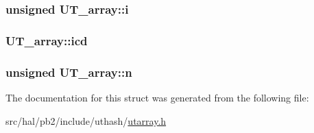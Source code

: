 \subsubsection[{\texorpdfstring{i}{i}}]{\setlength{\rightskip}{0pt plus 5cm}unsigned U\+T\+\_\+array\+::i}\hypertarget{struct_u_t__array_add4a738223f032481193cc5901cef56e}{}\label{struct_u_t__array_add4a738223f032481193cc5901cef56e}
\subsubsection[{\texorpdfstring{icd}{icd}}]{ U\+T\+\_\+array\+::icd}\hypertarget{struct_u_t__array_a8308fc1e930b18b9561e713fd13e5997}{}\label{struct_u_t__array_a8308fc1e930b18b9561e713fd13e5997}
\subsubsection[{\texorpdfstring{n}{n}}]{\setlength{\rightskip}{0pt plus 5cm}unsigned U\+T\+\_\+array\+::n}\hypertarget{struct_u_t__array_a48798687ef8b6a5ba3fbe806520c5824}{}\label{struct_u_t__array_a48798687ef8b6a5ba3fbe806520c5824}


The documentation for this struct was generated from the following file\+:\begin{DoxyCompactItemize}
\item 
src/hal/pb2/include/uthash/\hyperlink{utarray_8h}{utarray.\+h}\end{DoxyCompactItemize}
